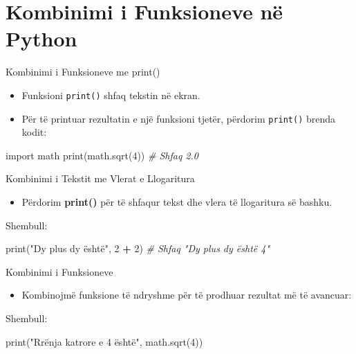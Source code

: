 \documentclass[
  ignorenonframetext,
]{beamer}
\newenvironment{Shaded}{\begin{snugshade}}{\end{snugshade}}
\newcommand{\BuiltInTok}[1]{#1}
\newcommand{\CommentTok}[1]{\textcolor[rgb]{0.56,0.35,0.01}{\textit{#1}}}
\newcommand{\DecValTok}[1]{\textcolor[rgb]{0.00,0.00,0.81}{#1}}
\newcommand{\ImportTok}[1]{#1}
\newcommand{\NormalTok}[1]{#1}
\newcommand{\OperatorTok}[1]{\textcolor[rgb]{0.81,0.36,0.00}{\textbf{#1}}}
\newcommand{\StringTok}[1]{\textcolor[rgb]{0.31,0.60,0.02}{#1}}
\providecommand{\tightlist}{%
  \setlength{\itemsep}{0pt}\setlength{\parskip}{0pt}}
\begin{document}
\hypertarget{kombinimi-i-funksioneve-nuxeb-python}{%
\section*{Kombinimi i Funksioneve në
Python}\label{kombinimi-i-funksioneve-nuxeb-python}}

\begin{frame}[fragile]{Kombinimi i Funksioneve me print()}
\protect\hypertarget{kombinimi-i-funksioneve-me-print}{}
\begin{itemize}
\item
  Funksioni \texttt{print()} shfaq tekstin në ekran.
\item
  Për të printuar rezultatin e një funksioni tjetër, përdorim
  \texttt{print()} brenda kodit:
\end{itemize}

\begin{Shaded}
\begin{Highlighting}[]
  \ImportTok{import}\NormalTok{ math}
  \BuiltInTok{print}\NormalTok{(math.sqrt(}\DecValTok{4}\NormalTok{))  }\CommentTok{\# Shfaq 2.0}
\end{Highlighting}
\end{Shaded}
\end{frame}

\begin{frame}[fragile]{Kombinimi i Tekstit me Vlerat e Llogaritura}
\protect\hypertarget{kombinimi-i-tekstit-me-vlerat-e-llogaritura}{}
\begin{itemize}
\tightlist
\item
  Përdorim \textbf{print()} për të shfaqur tekst dhe vlera të
  llogaritura së bashku.
\end{itemize}

Shembull:

\begin{Shaded}
\begin{Highlighting}[]
\BuiltInTok{print}\NormalTok{(}\StringTok{"Dy plus dy është"}\NormalTok{, }\DecValTok{2} \OperatorTok{+} \DecValTok{2}\NormalTok{)  }\CommentTok{\# Shfaq "Dy plus dy është 4"}
\end{Highlighting}
\end{Shaded}
\end{frame}

\begin{frame}[fragile]{Kombinimi i Funksioneve}
\protect\hypertarget{kombinimi-i-funksioneve}{}
\begin{itemize}
\tightlist
\item
  Kombinojmë funksione të ndryshme për të prodhuar rezultat më të
  avancuar:
\end{itemize}

Shembull:

\begin{Shaded}
\begin{Highlighting}[]
\BuiltInTok{print}\NormalTok{(}\StringTok{"Rrënja katrore e 4 është"}\NormalTok{, math.sqrt(}\DecValTok{4}\NormalTok{))}
\end{Highlighting}
\end{Shaded}
\end{frame}
\end{document}
